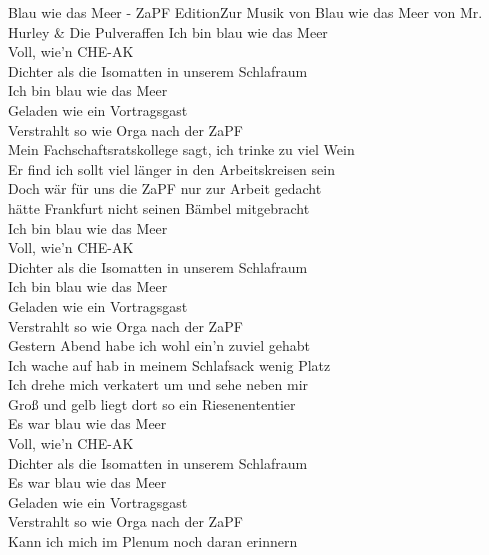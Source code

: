 
\begin{lied} {Blau wie das Meer - ZaPF Edition}{Zur Musik von Blau wie das Meer von Mr. Hurley \& Die Pulveraffen}
Ich bin blau wie das Meer \\
Voll, wie'n CHE-AK \\
Dichter als die Isomatten in unserem Schlafraum \\
Ich bin blau wie das Meer \\
Geladen wie ein Vortragsgast \\
Verstrahlt so wie Orga nach der ZaPF \\
\vspace{1em}
Mein Fachschaftsratskollege sagt, ich trinke zu viel Wein \\
Er find ich sollt viel länger in den Arbeitskreisen sein \\
Doch wär für uns die ZaPF nur zur Arbeit gedacht \\
hätte Frankfurt nicht seinen Bämbel mitgebracht \\
\vspace{1em}
Ich bin blau wie das Meer \\
Voll, wie'n CHE-AK \\
Dichter als die Isomatten in unserem Schlafraum \\
Ich bin blau wie das Meer \\
Geladen wie ein Vortragsgast \\
Verstrahlt so wie Orga nach der ZaPF \\
\vspace{1em}
Gestern Abend habe ich wohl ein'n zuviel gehabt \\
Ich wache auf hab in meinem Schlafsack wenig Platz \\
Ich drehe mich verkatert um und sehe neben mir \\
Groß und gelb liegt dort so ein Riesenententier \\
\vspace{1em}
Es war blau wie das Meer \\
Voll, wie'n CHE-AK \\
Dichter als die Isomatten in unserem Schlafraum \\
Es war blau wie das Meer \\
Geladen wie ein Vortragsgast \\
Verstrahlt so wie Orga nach der ZaPF \\
Kann ich mich im Plenum noch daran erinnern \\

\end{lied}
